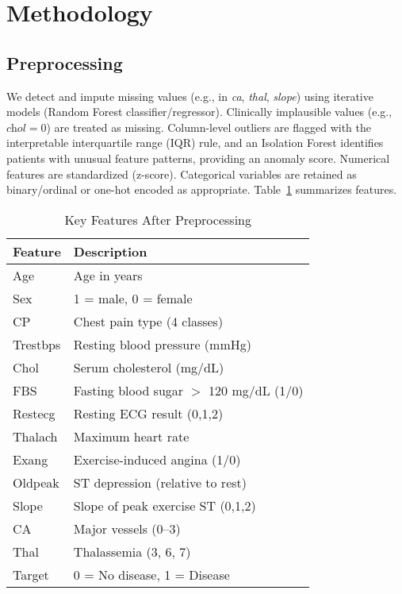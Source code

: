 \documentclass[conference]{IEEEtran}
\begin{document}
\section{Methodology}
\subsection{Preprocessing}
We detect and impute missing values (e.g., in \textit{ca}, \textit{thal}, \textit{slope}) using iterative models (Random Forest classifier/regressor). Clinically implausible values (e.g., \(\textit{chol}=0\)) are treated as missing. Column-level outliers are flagged with the interpretable interquartile range (IQR) rule, and an Isolation Forest identifies patients with unusual feature patterns, providing an anomaly score. Numerical features are standardized (z-score). Categorical variables are retained as binary/ordinal or one-hot encoded as appropriate. Table~\ref{tab:features} summarizes features.

\begin{table}[!t]
\centering
\caption{Key Features After Preprocessing}
\label{tab:features}
\begin{tabular}{@{}ll@{}}
\toprule
\textbf{Feature} & \textbf{Description} \\
\midrule
Age & Age in years \\
Sex & 1 = male, 0 = female \\
CP & Chest pain type (4 classes) \\
Trestbps & Resting blood pressure (mmHg) \\
Chol & Serum cholesterol (mg/dL) \\
FBS & Fasting blood sugar $>$ 120 mg/dL (1/0) \\
Restecg & Resting ECG result (0,1,2) \\
Thalach & Maximum heart rate \\
Exang & Exercise-induced angina (1/0) \\
Oldpeak & ST depression (relative to rest) \\
Slope & Slope of peak exercise ST (0,1,2) \\
CA & Major vessels (0--3) \\
Thal & Thalassemia (3, 6, 7) \\
Target & 0 = No disease, 1 = Disease \\
\bottomrule
\end{tabular}
\end{table}
\end{document}
